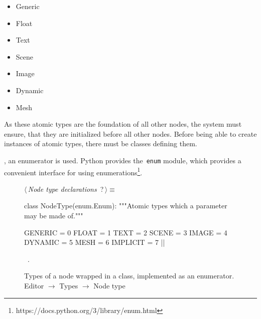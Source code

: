 \documentclass[%
    a4paper,    %
    justified,  %
    nobib,      %
    openany     %
]{tufte-book}
\begin{document}
\begin{itemize}
  \item{Generic}
  \item{Float}
  \item{Text}
  \item{Scene}
  \item{Image}
  \item{Dynamic}
  \item{Mesh}
\end{itemize}

As these atomic types are the foundation of all other nodes, the system must
ensure, that they are initialized before all other nodes. Before being able to
create instances of atomic types, there must be classes defining them.

, an enumerator is used.
Python provides the~\verb=enum= module, which provides a convenient interface
for using enumerations\footnote{https://docs.python.org/3/library/enum.html}.

\begin{figure}
\begin{flushleft} \small
\begin{minipage}{\linewidth}\label{scrap63}\raggedright\small
{} $\langle\,${\itshape Node type declarations}\nobreak\ {\footnotesize {?}}$\,\rangle\equiv$
\vspace{-1ex}
\begin{pythoncode}
class NodeType(enum.Enum):
    """Atomic types which a parameter may be made of."""

    GENERIC  = 0
    FLOAT    = 1
    TEXT     = 2
    SCENE    = 3
    IMAGE    = 4
    DYNAMIC  = 5
    MESH     = 6
    IMPLICIT = 7
|\NWsep|
\end{pythoncode}
\vspace{1.5ex}
\footnotesize
\begin{list}{}{\setlength{\itemsep}{-\parsep}\setlength{\itemindent}{-\leftmargin}}
\item \NWtxtMacroRefIn\ .

\item{}
\end{list}
\end{minipage}\vspace{4ex}
\end{flushleft}
\caption{Types of a node wrapped in a class, implemented as an enumerator.
  \newline{}\newline{}Editor $\rightarrow$ Types $\rightarrow$ Node type}
\label{editor:lst:types:node-type}
\end{figure}
\end{document}
